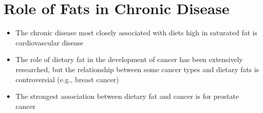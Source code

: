 \documentclass[title={Chapter 5}]{fdsn201notes}
\begin{document}
\section{Role of Fats in Chronic Disease}\label{sec:role-of-fats-in-chronic-disease}
\begin{itemize}
	\item The chronic disease most closely associated with diets high in saturated fat is cardiovascular disease
	\item The role of dietary fat in the development of cancer has been extensively researched, but the relationship between some cancer types and dietary fats is controversial (e.g., breast cancer)
	\item The strongest association between dietary fat and cancer is for prostate cancer
\end{itemize}
\end{document}
